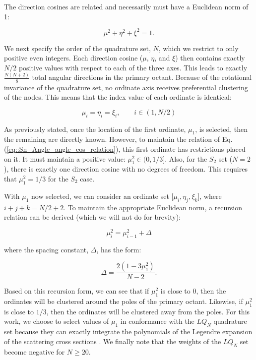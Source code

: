 \noindent The direction cosines are related and necessarily must have a Euclidean norm of 1:

\begin{equation}
\label{eq::Sn_Angle_angle_cos_relation}
\mu^2 + \eta^2 + \xi^2 = 1 .
\end{equation}


We next specify the order of the quadrature set, $N$, which we restrict to only positive even integers. Each direction cosine ($\mu$, $\eta$, and $\xi$) then contains exactly $N/2$ positive values with respect to each of the three axes. This leads to exactly $\frac{N(N+2)}{8}$ total angular directions in the primary octant. Because of the rotational invariance of the quadrature set, no ordinate axis receives preferential clustering of the nodes. This means that the index value of each ordinate is identical: 

\begin{equation}
\label{eq::Sn_Angle_LS_index_values}
\mu_i = \eta_i = \xi_i, \qquad i \in (1,N/2)
\end{equation}

As previously stated, once the location of the first ordinate, $\mu_1$, is selected, then the remaining are directly known. However, to maintain the relation of Eq. (\ref{eq::Sn_Angle_angle_cos_relation}), this first ordinate has restrictions placed on it. It must maintain a positive value: $\mu_1^2 \in (0, 1/3]$. Also, for the $S_2$ set ($N=2$), there is exactly one direction cosine with no degrees of freedom. This requires that $\mu_1^2 = 1/3$ for the $S_2$ case.

With $\mu_1$ now selected, we can consider an ordinate set [$\mu_i, \eta_j, \xi_k $], where $i+j+k = N/2 + 2$. To maintain the appropriate Euclidean norm, a recursion relation can be derived (which we will not do for brevity):

\begin{equation}
\label{eq::Sn_Angle_LS_ord_det}
\mu_i^2 = \mu_{i-1}^2 + \Delta
\end{equation}

\noindent where the spacing constant, $\Delta$, has the form:

\begin{equation}
\label{eq::Sn_Angle_LS_ord_det_constant}
 \Delta = \frac{2 (1-3 \mu_1^2)}{N-2}. 
\end{equation}

\noindent Based on this recursion form, we can see that if $\mu_1^2$ is close to 0, then the ordinates will be clustered around the poles of the primary octant. Likewise, if $\mu_1^2$ is close to $1/3$, then the ordinates will be clustered away from the poles. For this work, we choose to select values of $\mu_1$ in conformance with the $LQ_N$ quadrature set because they can exactly integrate the polynomials of the Legendre expansion of the scattering cross sections \cite{carlson1971}. We finally note that the weights of the $LQ_N$ set become negative for $N \geq 20$.

